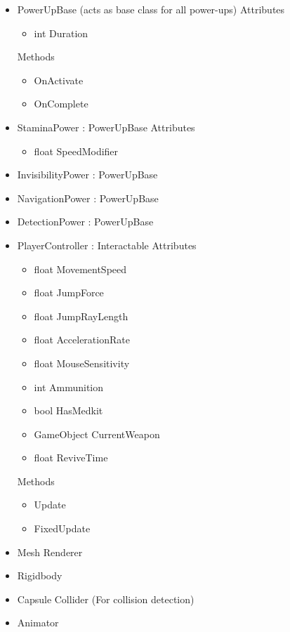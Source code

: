\documentclass[11pt]{article}
\begin{document}
\begin{itemize}
	\item PowerUpBase (acts as base class for all power-ups)
	\newline Attributes
	\begin{itemize}
		\item int Duration
	\end{itemize}
	Methods
	\begin{itemize}
		\item OnActivate
		\item OnComplete
	\end{itemize}
	\item StaminaPower : PowerUpBase
	\newline Attributes
	\begin{itemize}
		\item float SpeedModifier
	\end{itemize}
	\item InvisibilityPower : PowerUpBase
	\item NavigationPower : PowerUpBase
	\item DetectionPower : PowerUpBase
	\item PlayerController : Interactable
	\newline Attributes
	\begin{itemize}
		\item float MovementSpeed
		\item float JumpForce
		\item float JumpRayLength
		\item float AccelerationRate
		\item float MouseSensitivity
		\item int Ammunition
		\item bool HasMedkit
		\item GameObject CurrentWeapon
		\item float ReviveTime
	\end{itemize}
	Methods
	\begin{itemize}
		\item Update
		\item FixedUpdate
	\end{itemize}
	\item Mesh Renderer
	\item Rigidbody
	\item Capsule Collider (For collision detection)
	\item Animator
\end{itemize}
\end{document}

